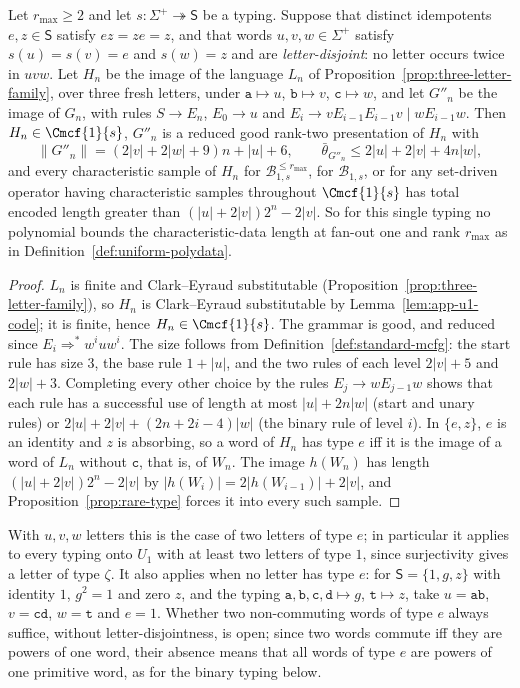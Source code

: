 \begin{corollary}
\label{cor:typing-level-obstruction}
Let $r_{\max}\ge2$ and let $s:\Sigma^+\twoheadrightarrow\mathsf S$ be a typing.
Suppose that distinct idempotents $e,z\in\mathsf S$ satisfy $ez=ze=z$, and that
words $u,v,w\in\Sigma^+$ satisfy $s(u)=s(v)=e$ and $s(w)=z$ and are
\emph{letter-disjoint}: no letter occurs twice in $uvw$.  Let $H_n$ be the image
of the language $L_n$ of Proposition~\ref{prop:three-letter-family}, over three
fresh letters, under $\mathtt a\mapsto u$, $\mathtt b\mapsto v$, $\mathtt c\mapsto w$,
and let $G''_n$ be the image of $G_n$, with rules $S\to E_n$, $E_0\to u$ and
$E_i\to vE_{i-1}E_{i-1}v\mid wE_{i-1}w$.  Then $H_n\in\Cmcf{1}{s}$, $G''_n$ is a
reduced good rank-two presentation of $H_n$ with
\[
 \|G''_n\|=(2|v|+2|w|+9)n+|u|+6,\qquad
 \bar\theta_{G''_n}\le2|u|+2|v|+4n|w|,
\]
and every characteristic sample of $H_n$ for $\mathcal B^{\le r_{\max}}_{1,s}$,
for $\mathcal B_{1,s}$, or for any set-driven operator having characteristic
samples throughout $\Cmcf{1}{s}$ has total encoded length greater than
$(|u|+2|v|)2^n-2|v|$.  So for this single typing no polynomial bounds the
characteristic-data length at fan-out one and rank $r_{\max}$ as in
Definition~\ref{def:uniform-polydata}.
\end{corollary}

\begin{proof}
$L_n$ is finite and Clark--Eyraud substitutable
(Proposition~\ref{prop:three-letter-family}), so $H_n$ is Clark--Eyraud
substitutable by Lemma~\ref{lem:app-u1-code}; it is finite, hence
$H_n\in\Cmcf{1}{s}$.  The grammar is good, and reduced since
$E_i\Rightarrow^*w^iuw^i$.  The size follows from
Definition~\ref{def:standard-mcfg}: the start rule has size $3$, the base rule
$1+|u|$, and the two rules of each level $2|v|+5$ and $2|w|+3$.  Completing every
other choice by the rules $E_j\to wE_{j-1}w$ shows that each rule has a
successful use of length at most $|u|+2n|w|$ (start and unary rules) or
$2|u|+2|v|+(2n+2i-4)|w|$ (the binary rule of level $i$).  In $\{e,z\}$, $e$ is an
identity and $z$ is absorbing, so a word of $H_n$ has type $e$ iff it is the
image of a word of $L_n$ without $\mathtt c$, that is, of $W_n$.  The image $h(W_n)$ has length
$(|u|+2|v|)2^n-2|v|$ by $|h(W_i)|=2|h(W_{i-1})|+2|v|$, and
Proposition~\ref{prop:rare-type} forces it into every such sample.
\end{proof}

With $u,v,w$ letters this is the case of two letters of type $e$; in
particular it applies to every typing onto $U_1$ with at least two letters of
type $1$, since surjectivity gives a letter of type $\zeta$.  It also applies
when no letter has type $e$: for $\mathsf S=\{1,g,z\}$ with identity $1$,
$g^2=1$ and zero $z$, and the typing $\mathtt a,\mathtt b,\mathtt c,\mathtt d\mapsto g$,
$\mathtt t\mapsto z$, take $u=\mathtt{ab}$, $v=\mathtt{cd}$, $w=\mathtt t$ and
$e=1$.  Whether two non-commuting words of type $e$ always suffice, without
letter-disjointness, is open; since two words commute iff they are powers of one word, their
absence means that all words of type $e$ are powers of one primitive word, as
for the binary typing below.

